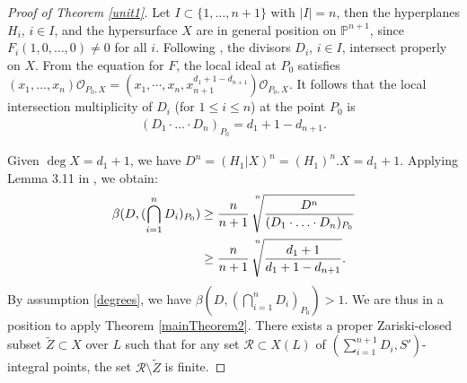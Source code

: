 \documentclass[10pt]{amsart}
\numberwithin{equation}{section}
\theoremstyle{plain}
\theoremstyle{definition}
\begin{document}
\begin{proof}[Proof of Theorem  \ref{unit1}]
 
Let $I \subset \{1,\ldots,n+1\}$ with $|I|=n$, then the hyperplanes $H_i$, $i \in I$, and the hypersurface $X$ are in general position on $\mathbb{P}^{n+1}$, since $F_i(1,0, \ldots,0) \neq 0$ for all $i$. 
Following \cite[Remark 2.13]{HLX}, the divisors $D_i$, $i \in I$, intersect properly on $X$.  From the equation for $F$, the local ideal at $P_0$ satisfies  $(x_{1},\ldots,x_{n}) \mathcal{O}_{P_0,X}=(x_{1},\cdots,x_{n},x_{{n+1}}^{d_1+1-d_{{n+1}}}) \mathcal{O}_{P_0,X}$. It follows that the local intersection multiplicity of $D_i$ (for  $1\le i\le n$) at the point  $P_0$ is 
\begin{align*}
(D_{1}\cdot\ldots\cdot D_{n})_{P_0}=d_1+1-d_{{n+1}}.
\end{align*}

Given $\deg X=d_1+1$, we have $D^n=(H_1|X)^n=(H_1)^n.X=d_1+1$. Applying Lemma 3.11 in \cite{HLX}, we obtain:
\begin{align*}
\beta(D,(\bigcap_{i=1}^{n} D_{i})_{P_0}) &\geq \frac{n}{n+1}\sqrt[\leftroot{-3}\uproot{20}n]{\frac{D^n}{(D_{1}\cdot\ldots\cdot D_{n})_{P_0}}}\\
&\geq  \frac{n}{n+1}\sqrt[\leftroot{-3}\uproot{20}n]{\frac{d_1+1}{d_1+1-d_{{n+1}}}} .
\end{align*}
 By assumption \eqref{degrees}, we have $\beta(D,(\bigcap_{i=1}^{n} D_{i})_{P_0})>1$. 
We are thus in a position to apply Theorem \ref{mainTheorem2}.   There exists a proper Zariski-closed subset $\tilde Z\subset X$ over $L$ such that for any set $\mathcal R\subset X(L)$ of $(\sum_{i=1}^{n+1}D_i, S')$-integral points, the set   $\mathcal R\setminus \tilde Z$ is finite.  

\end{proof}
\end{document}
